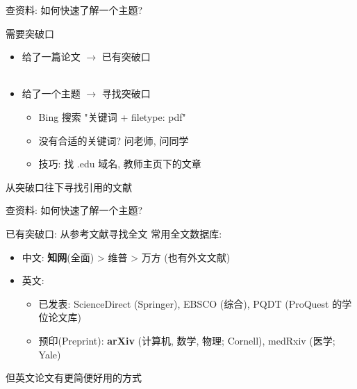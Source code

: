 \documentclass[UTF8]{ctexbeamer}
\begin{document}
\begin{frame}{查资料: 如何快速了解一个主题?}
\begin{alertblock}{需要突破口}
    \begin{itemize}
        \item 给了一篇论文 $\xrightarrow{}$ 已有突破口\\ \ \\
        \item 给了一个主题 $\xrightarrow{}$ 寻找突破口
        \begin{itemize}
            \item Bing 搜索 "关键词 + filetype: pdf"
            \item 没有合适的关键词? 问老师, 问同学
            \item 技巧: 找 .edu 域名, 教师主页下的文章
        \end{itemize}
    \end{itemize}
\end{alertblock}
\begin{alertblock}{从突破口往下寻找引用的文献}
\end{alertblock}
\end{frame}


\begin{frame}{查资料: 如何快速了解一个主题?}
\begin{alertblock}{已有突破口: 从参考文献寻找全文}
常用全文数据库:
    \begin{itemize}
        \item 中文: \textbf{知网}(全面) > 维普 > 万方 (也有外文文献) 
        \item 英文: 
        \begin{itemize}
            \item 已发表: ScienceDirect (Springer), EBSCO (综合), PQDT (ProQuest 的学位论文库) 
            \item 预印(Preprint): \textbf{arXiv} (计算机, 数学, 物理; Cornell), medRxiv (医学; Yale) 
        \end{itemize}
    \end{itemize}
\end{alertblock}
\begin{alertblock}{但英文论文有更简便好用的方式}
\end{alertblock}
\end{frame}
\end{document}
